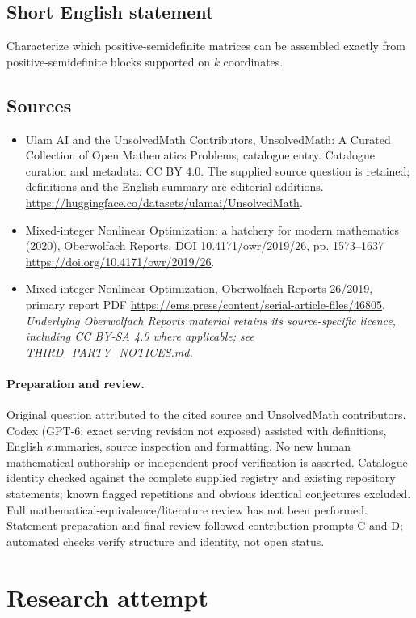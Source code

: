 \documentclass[11pt]{article}
\begin{document}
\subsection{Short English statement}
Characterize which positive-semidefinite matrices can be assembled exactly from positive-semidefinite blocks supported on $k$ coordinates.
\subsection{Sources}
\begin{itemize}
\item[S1] Ulam AI and the UnsolvedMath Contributors, UnsolvedMath: A Curated Collection of Open Mathematics Problems, catalogue entry. Catalogue curation and metadata: CC BY 4.0. The supplied source question is retained; definitions and the English summary are editorial additions.
\url{https://huggingface.co/datasets/ulamai/UnsolvedMath}.
\item[S2] Mixed-integer Nonlinear Optimization: a hatchery for modern mathematics (2020), Oberwolfach Reports, DOI 10.4171/owr/2019/26, pp. 1573--1637
\url{https://doi.org/10.4171/owr/2019/26}.
\item[S3] Mixed-integer Nonlinear Optimization, Oberwolfach Reports 26/2019, primary report PDF
\url{https://ems.press/content/serial-article-files/46805}.
\textit{Underlying Oberwolfach Reports material retains its source-specific licence, including CC BY-SA 4.0 where applicable; see THIRD\_PARTY\_NOTICES.md.}
\end{itemize}
\paragraph{Preparation and review.}
Original question attributed to the cited source and UnsolvedMath contributors. Codex (GPT-6; exact serving revision not exposed) assisted with definitions, English summaries, source inspection and formatting. No new human mathematical authorship or independent proof verification is asserted. Catalogue identity checked against the complete supplied registry and existing repository statements; known flagged repetitions and obvious identical conjectures excluded. Full mathematical-equivalence/literature review has not been performed. Statement preparation and final review followed contribution prompts C and D; automated checks verify structure and identity, not open status.
\label{end:statement}

\section{Research attempt}
\end{document}
